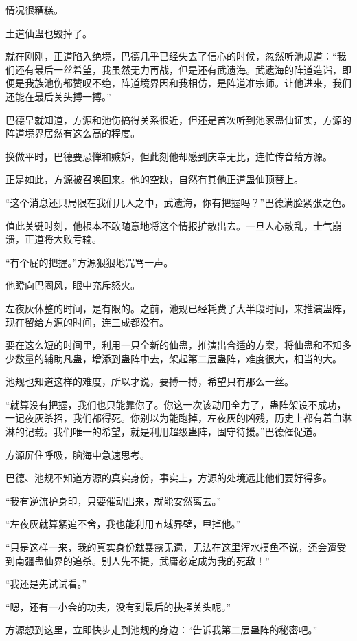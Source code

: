 \begin{this_body}
情况很糟糕。

土道仙蛊也毁掉了。

就在刚刚，正道陷入绝境，巴德几乎已经失去了信心的时候，忽然听池规道：“我们还有最后一丝希望，我虽然无力再战，但是还有武遗海。武遗海的阵道造诣，即便是我族池伤都赞叹不绝，阵道境界因和我相仿，是阵道准宗师。让他进来，我们还能在最后关头搏一搏。”

巴德早就知道，方源和池伤搞得关系很近，但还是首次听到池家蛊仙证实，方源的阵道境界居然有这么高的程度。

换做平时，巴德要忌惮和嫉妒，但此刻他却感到庆幸无比，连忙传音给方源。

正是如此，方源被召唤回来。他的空缺，自然有其他正道蛊仙顶替上。

“这个消息还只局限在我们几人之中，武遗海，你有把握吗？”巴德满脸紧张之色。

值此关键时刻，他根本不敢随意地将这个情报扩散出去。一旦人心散乱，士气崩溃，正道将大败亏输。

“有个屁的把握。”方源狠狠地咒骂一声。

他瞪向巴圈风，眼中充斥怒火。

左夜灰休整的时间，是有限的。之前，池规已经耗费了大半段时间，来推演蛊阵，现在留给方源的时间，连三成都没有。

要在这么短的时间里，利用一只全新的仙蛊，推演出合适的方案，将仙蛊和不知多少数量的辅助凡蛊，增添到蛊阵中去，架起第二层蛊阵，难度很大，相当的大。

池规也知道这样的难度，所以才说，要搏一搏，希望只有那么一丝。

“就算没有把握，我们也只能靠你了。你这一次该动用全力了，蛊阵架设不成功，一记夜灰杀招，我们都得死。你别以为能跑掉，左夜灰的凶残，历史上都有着血淋淋的记载。我们唯一的希望，就是利用超级蛊阵，固守待援。”巴德催促道。

方源屏住呼吸，脑海中急速思考。

巴德、池规不知道方源的真实身份，事实上，方源的处境远比他们要好得多。

“我有逆流护身印，只要催动出来，就能安然离去。”

“左夜灰就算紧追不舍，我也能利用五域界壁，甩掉他。”

“只是这样一来，我的真实身份就暴露无遗，无法在这里浑水摸鱼不说，还会遭受到南疆蛊仙界的追杀。别人先不提，武庸必定成为我的死敌！”

“我还是先试试看。”

“嗯，还有一小会的功夫，没有到最后的抉择关头呢。”

方源想到这里，立即快步走到池规的身边：“告诉我第二层蛊阵的秘密吧。”


\end{this_body}
